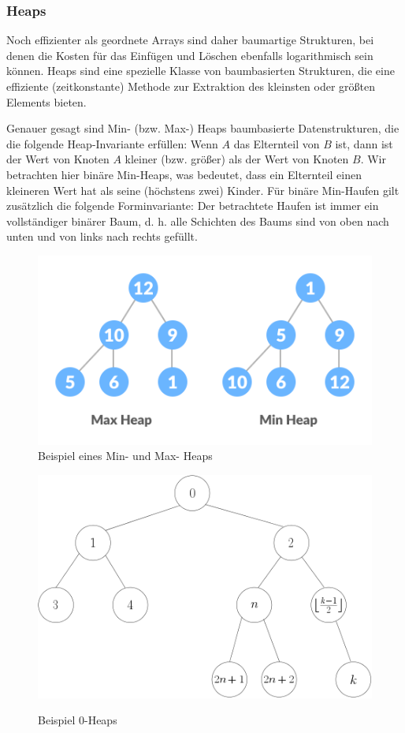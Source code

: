 \documentclass[a4paper]{article}
\begin{document}
\subsubsection{Heaps}
Noch effizienter als geordnete Arrays sind daher baumartige Strukturen, bei denen die Kosten für das Einfügen und Löschen ebenfalls logarithmisch sein können. Heaps sind eine spezielle Klasse von baumbasierten Strukturen, die eine effiziente (zeitkonstante) Methode zur Extraktion des kleinsten oder größten Elements bieten.

Genauer gesagt sind Min- (bzw. Max-) Heaps baumbasierte Datenstrukturen, die die folgende Heap-Invariante erfüllen: Wenn $A$ das Elternteil von $B$ ist, dann ist der Wert von Knoten $A$ kleiner (bzw. größer) als der Wert von Knoten $B$. Wir betrachten hier binäre Min-Heaps, was bedeutet, dass ein Elternteil einen kleineren Wert hat als seine (höchstens zwei) Kinder. Für binäre Min-Haufen gilt zusätzlich die folgende Forminvariante: Der betrachtete Haufen ist immer ein vollständiger binärer Baum, d. h. alle Schichten des Baums sind von oben nach unten und von links nach rechts gefüllt.


\begin{figure}[h] 
\caption{Beispiel eines Min- und Max- Heaps}
\centering
\label{fig: Min/Max-heap}
\includegraphics[scale= 0.7]{Pictures/max-heap-min-heap.png}
\end{figure}

\begin{figure}[h] 
\caption{Beispiel 0-Heaps}
\centering
\includegraphics[scale= 0.5]{Pictures/0-heap.png}
\label{fig: 0-Heap}
\end{figure}
\end{document}
